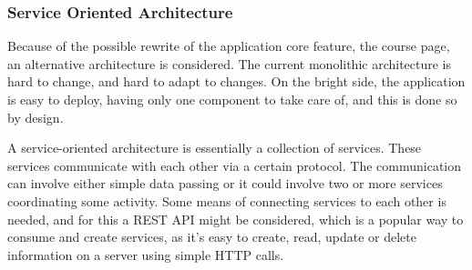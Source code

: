\subsubsection{Service Oriented Architecture}
Because of the possible rewrite of the application core feature, the course page,
an alternative architecture is considered. The current monolithic architecture is
hard to change, and hard to adapt to changes. On the bright side, the application is easy
to deploy, having only one component to take care of, and this is done so by design.

A service-oriented architecture is essentially a collection of services. These
services communicate with each other via a certain protocol. The communication can involve either
simple data passing or it could involve two or more services coordinating some
activity. Some means of connecting services to each other is needed, and for this
a REST API might be considered, which is a popular way to consume and create services,
as it's easy to create, read, update or delete information on a server using simple HTTP calls.

\clearpage

